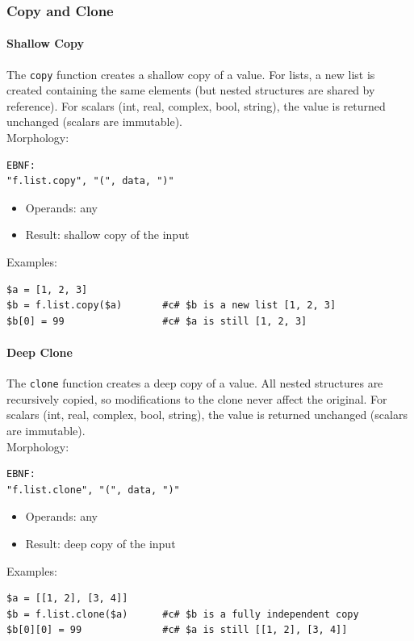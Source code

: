\subsubsection{Copy and Clone}
\paragraph{Shallow Copy}
The \texttt{copy} function creates a shallow copy of a value. For lists, a new list is created containing the same elements (but nested structures are shared by reference). For scalars (int, real, complex, bool, string), the value is returned unchanged (scalars are immutable).\\
Morphology:
\begin{verbatim}
EBNF:
"f.list.copy", "(", data, ")"
\end{verbatim}
\begin{itemize}
\item Operands: any
\item Result: shallow copy of the input
\end{itemize}
Examples:
\begin{verbatim}
$a = [1, 2, 3]
$b = f.list.copy($a)       #c# $b is a new list [1, 2, 3]
$b[0] = 99                 #c# $a is still [1, 2, 3]
\end{verbatim}

\paragraph{Deep Clone}
The \texttt{clone} function creates a deep copy of a value. All nested structures are recursively copied, so modifications to the clone never affect the original. For scalars (int, real, complex, bool, string), the value is returned unchanged (scalars are immutable).\\
Morphology:
\begin{verbatim}
EBNF:
"f.list.clone", "(", data, ")"
\end{verbatim}
\begin{itemize}
\item Operands: any
\item Result: deep copy of the input
\end{itemize}
Examples:
\begin{verbatim}
$a = [[1, 2], [3, 4]]
$b = f.list.clone($a)      #c# $b is a fully independent copy
$b[0][0] = 99              #c# $a is still [[1, 2], [3, 4]]
\end{verbatim}

